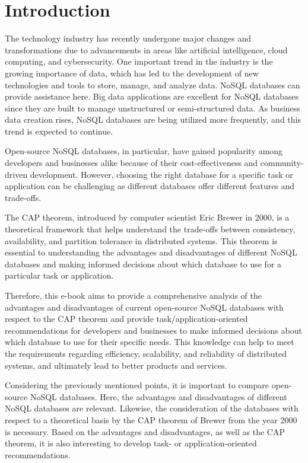 
\chapter{Introduction} \label{ch:introduction}

The technology industry has recently undergone major changes and transformations due to advancements in areas like artificial intelligence, cloud computing, and cybersecurity. One important trend in the industry is the growing importance of data, which has led to the development of new technologies and tools to store, manage, and analyze data. \ac{NoSQL} databases can provide assistance here. Big data applications are excellent for \ac{NoSQL} databases since they are built to manage unstructured or semi-structured data. As business data creation rises, \ac{NoSQL} databases are being utilized more frequently, and this trend is expected to continue. 

Open-source \ac{NoSQL} databases, in particular, have gained popularity among developers and businesses alike because of their cost-effectiveness and community-driven development. However, choosing the right database for a specific task or application can be challenging as different databases offer different features and trade-offs.

The \ac{CAP} theorem, introduced by computer scientist Eric Brewer in 2000, is a theoretical framework that helps understand the trade-offs between consistency, availability, and partition tolerance in distributed systems. This theorem is essential to understanding the advantages and disadvantages of different \ac{NoSQL} databases and making informed decisions about which database to use for a particular task or application.

Therefore, this e-book aims to provide a comprehensive analysis of the advantages and disadvantages of current open-source \ac{NoSQL} databases with respect to the \ac{CAP} theorem and provide task/application-oriented recommendations for developers and businesses to make informed decisions about which database to use for their specific needs. This knowledge can help to meet the requirements regarding efficiency, scalability, and reliability of distributed systems, and ultimately lead to better products and services.

Considering the previously mentioned points, it is important to compare open-source \ac{NoSQL} databases. Here, the advantages and disadvantages of different \ac{NoSQL} databases are relevant. Likewise, the consideration of the databases with respect to a theoretical basis by the \ac{CAP} theorem of Brewer from the year 2000 is necessary. Based on the advantages and disadvantages, as well as the \ac{CAP} theorem, it is also interesting to develop task- or application-oriented recommendations. 

